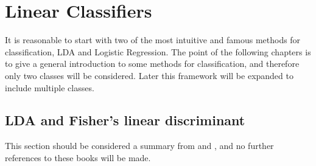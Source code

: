 \section{Linear Classifiers}
\label{sec:Linear Classifiers}
It is reasonable to start with two of the most intuitive and famous methods for classification, LDA and Logistic Regression. The point of the following chapters is to give a general introduction to some methods for classification, and therefore only two classes will be considered. Later this framework will be expanded to include multiple classes.
%
\subsection{LDA and Fisher's linear discriminant}
\label{sub:LDA and Fisher's linear discriminant}
This section should be considered a summary from \cite[ch.~4.1.4]{bishop} and \cite[ch.~4.3]{modstat}, and no further references to these books will be made. 

